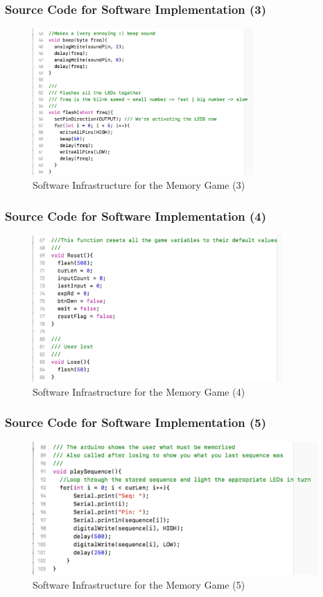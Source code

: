 \documentclass[xcolor={usenames,dvipsnames},hyperref={hyperindex,bookmarks}]{beamer}
\begin{document}
\frame
{
	\frametitle{Source Code for Software Implementation (3)}

\begin{figure}[h]
\centering 
\includegraphics[height=2.2in]{./pics/sw-infrastructure2}
\caption{Software Infrastructure for the Memory Game (3)}
\label{fig:swinfrastructure2}
\end{figure}
}







\frame
{
	\frametitle{Source Code for Software Implementation (4)}

\begin{figure}[h]
\centering 
\includegraphics[height=2.2in]{./pics/sw-infrastructure3}
\caption{Software Infrastructure for the Memory Game (4)}
\label{fig:swinfrastructure3}
\end{figure}
}



\frame
{
	\frametitle{Source Code for Software Implementation (5)}

\begin{figure}[h]
\centering 
\includegraphics[height=2.0in]{./pics/sw-infrastructure4}
\caption{Software Infrastructure for the Memory Game (5)}
\label{fig:swinfrastructure4}
\end{figure}
}
\end{document}
